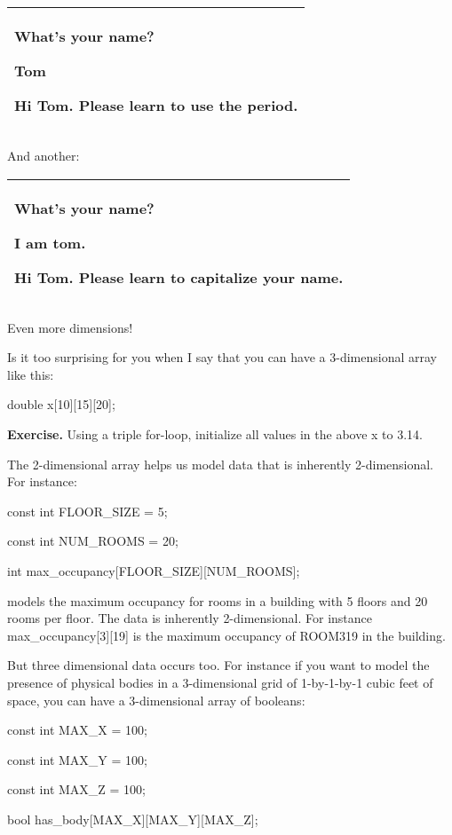 \documentclass[
]{article}
\begin{document}
\begin{longtable}[]{@{}l@{}}
\toprule
\endhead
\begin{minipage}[t]{0.97\columnwidth}\raggedright
What's your name?

Tom

Hi Tom. Please learn to use the period.\strut
\end{minipage}\tabularnewline
\bottomrule
\end{longtable}

And another:

\begin{longtable}[]{@{}l@{}}
\toprule
\endhead
\begin{minipage}[t]{0.97\columnwidth}\raggedright
What's your name?

I am tom.

Hi Tom. Please learn to capitalize your name.\strut
\end{minipage}\tabularnewline
\bottomrule
\end{longtable}

Even more dimensions!

Is it too surprising for you when I say that you can have a
3-dimensional array like this:

double x{[}10{]}{[}15{]}{[}20{]};

\textbf{Exercise.} Using a triple for-loop, initialize all values in the
above x to 3.14.

The 2-dimensional array helps us model data that is inherently
2-dimensional. For instance:

const int FLOOR\_SIZE = 5;

const int NUM\_ROOMS = 20;

int max\_occupancy{[}FLOOR\_SIZE{]}{[}NUM\_ROOMS{]};

models the maximum occupancy for rooms in a building with 5 floors and
20 rooms per floor. The data is inherently 2-dimensional. For instance
max\_occupancy{[}3{]}{[}19{]} is the maximum occupancy of ROOM319 in the
building.

But three dimensional data occurs too. For instance if you want to model
the presence of physical bodies in a 3-dimensional grid of 1-by-1-by-1
cubic feet of space, you can have a 3-dimensional array of booleans:

const int MAX\_X = 100;

const int MAX\_Y = 100;

const int MAX\_Z = 100;

bool has\_body{[}MAX\_X{]}{[}MAX\_Y{]}{[}MAX\_Z{]};
\end{document}
